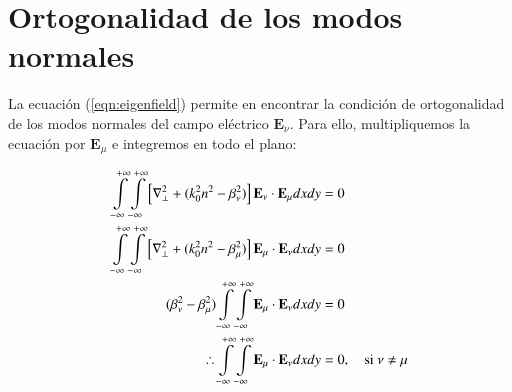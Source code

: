 \chapter{Ortogonalidad de los modos normales \label{sec:orto}}

La ecuación (\ref{eqn:eigenfield}) permite en encontrar la condición de ortogonalidad de los modos normales del campo eléctrico  $\textbf{E}_\nu$. Para ello, multipliquemos la ecuación por $\textbf{E}_\mu$ e integremos en todo el plano:

\begin{align*}
	 \int\displaylimits_{-\infty}^{+\infty}\int\displaylimits_{-\infty}^{+\infty}\left[  \nabla_\perp^2  + (k_0^2n^2 - \beta_\nu^2) \right]\textbf{E}_\nu \cdot\textbf{E}_\mu dxdy &=  0
	 \\
	 	 \int\displaylimits_{-\infty}^{+\infty}\int\displaylimits_{-\infty}^{+\infty}\left[  \nabla_\perp^2  + (k_0^2n^2 - \beta_\mu^2) \right]\textbf{E}_\mu \cdot\textbf{E}_\nu dxdy &=  0
	 	 \\
	 	 (\beta_\nu^2-\beta_\mu^2)\int\displaylimits_{-\infty}^{+\infty}\int\displaylimits_{-\infty}^{+\infty}\textbf{E}_\mu \cdot\textbf{E}_\nu dxdy &=  0
	 	 \\
	 	 \therefore \int\displaylimits_{-\infty}^{+\infty}\int\displaylimits_{-\infty}^{+\infty}\textbf{E}_\mu \cdot\textbf{E}_\nu dxdy &= 0, \quad \text{si } \nu\neq\mu
\end{align*}